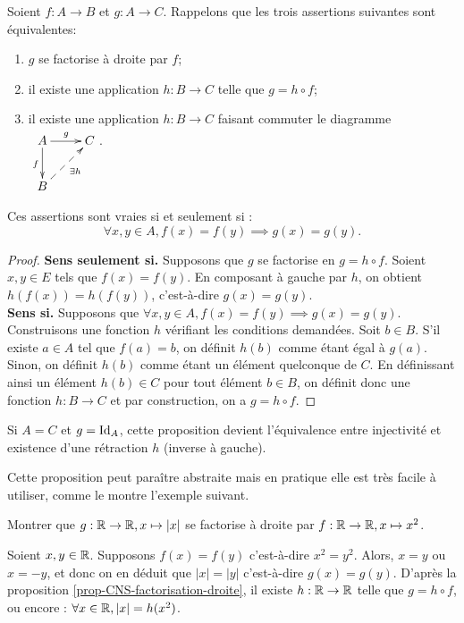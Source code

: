 \begin{proposition}
\label{prop-CNS-factorisation-droite}
Soient $f : A\to B$ et $g : A\to C$. Rappelons que les trois assertions suivantes sont équivalentes:
\begin{enumerate}
\item  $g$ se factorise à droite par $f$;
\item il existe une application $h : B\to C$ telle que $g = h\circ f$;
\item il existe une application $h : B\to C$ faisant commuter  le diagramme  
$\xymatrix{
A \ar[r]^g \ar[d]_{f}& C\\
B \ar@{-->}[ur]_{\exists h}& 
}$.
\end{enumerate}
Ces assertions sont vraies si et seulement si :
\[\forall x, y \in A, f(x)=f(y) \implies g(x)=g(y).\]
\end{proposition}
\begin{proof}
\textbf{Sens \og seulement si\fg.} Supposons que $g$ se factorise en $g = h\circ f$. Soient $x, y\in E$ tels que $f(x)=f(y)$. En composant à gauche par $h$, on obtient $h(f(x)) = h(f(y))$, c'est-à-dire $g(x)=g(y)$.\\
\textbf{Sens \og si\fg.} Supposons que $\forall x, y \in A, f(x)=f(y) \implies g(x)=g(y)$. Construisons une fonction $h$ vérifiant les conditions demandées. Soit $b\in B$. S'il existe $a\in A$ tel que $f(a)=b$, on définit $h(b)$ comme étant égal à $g(a)$. Sinon, on définit $h(b)$ comme étant un élément quelconque de $C$. En définissant ainsi un élément $h(b)\in C$ pour tout élément $b\in B$, on définit donc une fonction $h : B\to C$ et par construction, on a $g = h\circ f$.
\end{proof}

\begin{remarque} Si $A=C$ et $g=\operatorname{Id}_A$, cette proposition devient l'équivalence entre injectivité et existence d'une rétraction $h$ (inverse à gauche).
\end{remarque}

Cette proposition peut paraître abstraite mais en pratique elle est très facile à utiliser, comme le montre l'exemple suivant.
\begin{exemple}
Montrer que $g : \mathbb{R}\to\mathbb{R}, x\mapsto |x|$ se factorise à droite par $f : \mathbb{R}\to \mathbb{R}, x\mapsto x^2$.
\end{exemple}
\begin{red}
Soient $x, y\in \mathbb{R}$. Supposons $f(x)=f(y)$ c'est-à-dire $x^2=y^2$. Alors, $x=y$ ou $x=-y$, et donc on en déduit que $|x|=|y|$ c'est-à-dire $g(x)=g(y)$. D'après la proposition \ref{prop-CNS-factorisation-droite}, il existe $h : \mathbb{R}\to \mathbb{R}$ telle que $g =h\circ f$, ou encore : $\forall x\in \mathbb{R}, |x|=h(x^2)$. 
\end{red}

